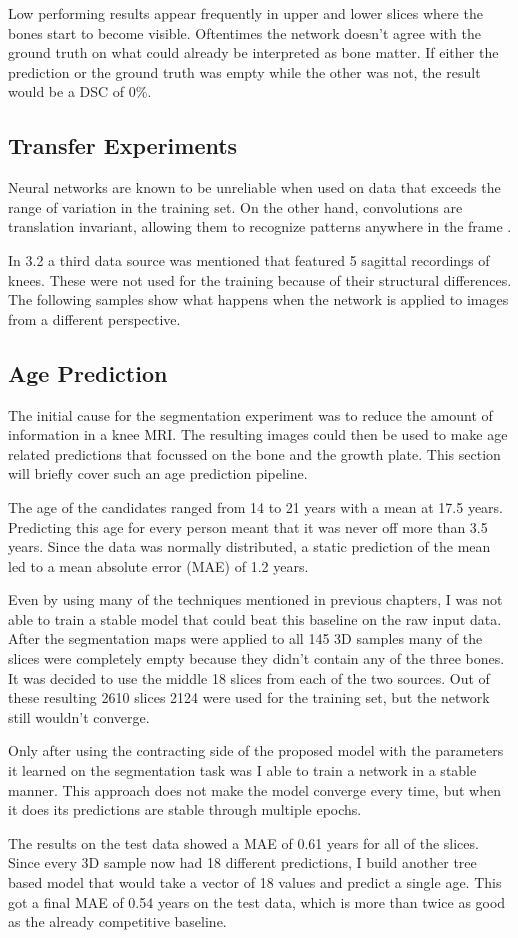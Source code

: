 Low performing results appear frequently in upper and lower slices where the bones start to become visible. Oftentimes the network doesn't agree with the ground truth on what could already be interpreted as bone matter. If either the prediction or the ground truth was empty while the other was not, the result would be a DSC of 0\%.

\subsection{Transfer Experiments}

Neural networks are known to be unreliable when used on data that exceeds the range of variation in the training set. On the other hand, convolutions are translation invariant, allowing them to recognize patterns anywhere in the frame \cite{Chollet2017}. 

In 3.2 a third data source was mentioned that featured 5 sagittal recordings of knees. These were not used for the training because of their structural differences. The following samples show what happens when the network is applied to images from a different perspective.

\subsection{Age Prediction}

The initial cause for the segmentation experiment was to reduce the amount of information in a knee MRI. The resulting images could then be used to make age related predictions that focussed on the bone and the growth plate. This section will briefly cover such an age prediction pipeline.

The age of the candidates ranged from 14 to 21 years with a mean at 17.5 years. Predicting this age for every person meant that it was never off more than 3.5 years. Since the data was normally distributed, a static prediction of the mean led to a mean absolute error (MAE) of 1.2 years.

Even by using many of the techniques mentioned in previous chapters, I was not able to train a stable model that could beat this baseline on the raw input data. After the segmentation maps were applied to all 145 3D samples many of the slices were completely empty because they didn't contain any of the three bones. It was decided to use the middle 18 slices from each of the two sources. Out of these resulting 2610 slices 2124 were used for the training set, but the network still wouldn't converge.

Only after using the contracting side of the proposed model with the parameters it learned on the segmentation task was I able to train a network in a stable manner. This approach does not make the model converge every time, but when it does its predictions are stable through multiple epochs. 

The results on the test data showed a MAE of 0.61 years for all of the slices. Since every 3D sample now had 18 different predictions, I build another tree based model that would take a vector of 18 values and predict a single age. This got a final MAE of 0.54 years on the test data, which is more than twice as good as the already competitive baseline.

\newpage